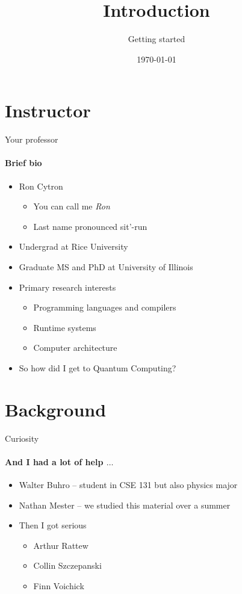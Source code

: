 
\title{Introduction}
\subtitle{Getting started}

\date{\today}

\begin{frame}
\maketitle
\end{frame}
\section{Instructor}
\begin{frame}{Your professor}
\framesubtitle{Brief bio}
\begin{itemize}
    \item Ron Cytron
    \begin{itemize}
        \item You can call me \emph{Ron}
        \item Last name pronounced sit'-run
    \end{itemize}
    \item Undergrad at Rice University
    \item Graduate MS and PhD at University of Illinois
    \item Primary research interests
    \begin{itemize}
        \item Programming languages and compilers
        \item Runtime systems
        \item Computer architecture
    \end{itemize}
    \item So how did I get to Quantum Computing?
\end{itemize}
    
\end{frame}

\section{Background}
\begin{frame}{Curiosity}
\framesubtitle{And I had a lot of help $\ldots$}
\begin{itemize}
    \item Walter Buhro -- student in CSE 131 but also physics major
    \item Nathan Mester -- we studied this material over a summer
    \item Then I got serious
    \begin{itemize}
        \item Arthur Rattew
        \item Collin Szczepanski
        \item Finn Voichick
    \end{itemize}
\end{itemize}
    
\end{frame}

